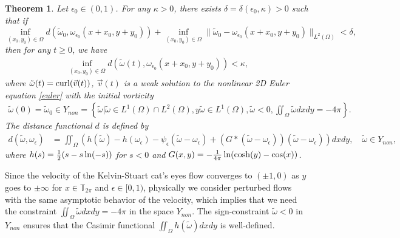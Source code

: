 \documentclass[1 [leqno, 11pt]{amsart}
\numberwithin{equation}{section}
\let\ep=\epsilon
\def\curl{\mathop{\rm curl}\nolimits}
\newtheorem{Theorem}{Theorem}[section]
\begin{document}
\begin{CJK*}{GBK}{song}
\begin{Theorem}\label{main result4-nonlinear orbital stability}
Let $\ep_0 \in (0, 1)$. For any $\kappa>0$, there exists $\delta=\delta(\ep_0,\kappa)>0$ such that if
$$\inf_{(x_0,y_0)\in\Omega} d(\tilde \omega_0,\omega_{\ep_0}(x+x_0,y+y_0))+\inf_{(x_0,y_0)\in\Omega}\|\tilde \omega_0-\omega_{\ep_0}(x+x_0,y+y_0)\|_{L^2(\Omega)}<\delta,$$
 then for any $t\geq0$, we have
\begin{align}\label{onlinear orbital stability-goal}
\inf_{(x_0,y_0)\in\Omega}d(\tilde \omega(t),\omega_{\ep_0}(x+x_0,y+y_0))<\kappa,
\end{align}
where $\tilde \omega(t)=\curl(\vec{v}(t))$, $\vec{v}(t)$ is a weak solution to the nonlinear 2D Euler equation \eqref{euler} with the initial vorticity
 \begin{align}\label{def-X-non-ep}
\tilde \omega(0)=\tilde \omega_0\in Y_{non}= \left\{ \tilde \omega|\tilde\omega\in L^1(\Omega)\cap L^2(\Omega),
  y\tilde \omega\in L^1(\Omega),\tilde \omega<0,\iint_{\Omega}\tilde \omega dxdy=-4\pi\right\}.
\end{align} The distance functional $d$ is defined by
\begin{align}\nonumber
d(\tilde\omega,\omega_\ep)&=\iint_{\Omega}(h(\tilde \omega ) - h(\omega_\ep)  - \psi_\ep(\tilde  \omega-\omega_\ep)+(G*(\tilde \omega-\omega_\ep))(\tilde \omega-\omega_\ep))dxdy, \quad\tilde \omega\in Y_{non},
\end{align}
where $h(s)={1\over2}(s-s\ln(-s))$ for $s<0$ and $G(x,y)=-{1\over 4\pi}\ln(\cosh(y)-\cos(x))$.
\end{Theorem}

Since the  velocity of the Kelvin-Stuart cat's eyes flow converges to
$ (\pm1, 0) $ as $y$ goes to $\pm\infty$
 for $x\in\mathbb{T}_{2\pi}$ and $\epsilon\in[0,1)$, physically we  consider perturbed flows with the same asymptotic behavior of  the  velocity, which implies that
we need the constraint  $\iint_{\Omega}\tilde \omega dxdy=-4\pi$ in the space $Y_{non}$.  The sign-constraint  $\tilde \omega<0$ in $Y_{non}$ ensures  that the Casimir functional $\iint_\Omega h(\tilde \omega)dxdy$ is well-defined.



\end{CJK*}
\end{document}
